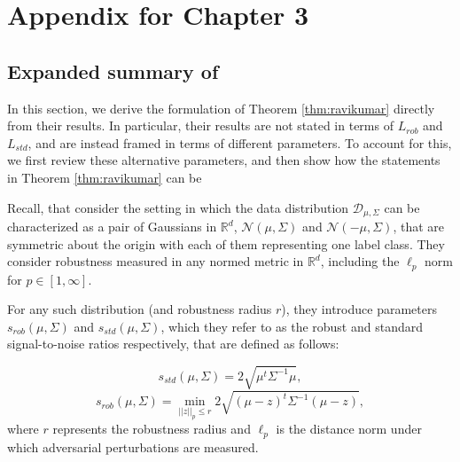 \graphicspath{{./chapters/chapter2/}}
\newcommand\numeq[1]%
  {\stackrel{\scriptscriptstyle(\mkern-1.5mu#1\mkern-1.5mu)}{=}}
 \newcommand\numgeq[1]%
  {\stackrel{\scriptscriptstyle(\mkern-1.5mu#1\mkern-1.5mu)}{\geq}}
  
\def\D{{\mathcal D}}
\def\Pphi{\overline{\Phi}}
\def\F{{\mathcal F}}
\def\N{{\mathcal N}}
\def\E{{\mathbb E}}
\def\A{\Pi}
\def\B{\Sigma}
\def\diam{\text{diam}}
\def\c{\mathcal L}
\def\l{\ell}
\def\seq{seq}
\def\R{\mathbb{R}}
\def\C{\mathcal C}
\def\p{p}
\def\s{size}
\def\L{\mathcal L}
\def\o{opt}
\def\H{\mathcal H}
\def\calH{\mathcal H}
\def\of{approxCluster}
\def\on{onlineCluster}
\def\R{\mathbb R}
\def\Y{\{\pm 1\}}
\def\U{\mathbb U}
\def\dd{\Delta}
\def\simp{{U\Delta}}
\def\g{g}
\def\rr{R}
\def\f{f}


\chapter{Appendix for Chapter 3}

\section{Expanded summary of \cite{ravikumar20}}\label{sec:appendix_comparison}

In this section, we derive the formulation of Theorem \ref{thm:ravikumar} directly from their results. In particular, their results are not stated in terms of $L_{rob}$ and $L_{std}$, and are instead framed in terms of different parameters. To account for this, we first review these alternative parameters, and then show how the statements in Theorem \ref{thm:ravikumar} can be 

Recall, that \cite{ravikumar20} consider the setting in which the data distribution $\D_{\mu, \Sigma}$ can be characterized as a pair of Gaussians in $\R^d$, $\N(\mu, \Sigma)$ and $\N(-\mu, \Sigma)$, that are symmetric about the origin with each of them representing one label class. They consider robustness measured in any normed metric in $\R^d$, including the $\ell_p$ norm for $p \in [1, \infty]$. 

For any such distribution (and robustness radius $r$), they introduce parameters $s_{rob}(\mu, \Sigma)$ and $s_{std}(\mu, \Sigma)$, which they refer to as the robust and standard signal-to-noise ratios respectively, that are defined as follows:

$$s_{std}(\mu, \Sigma) = 2\sqrt{\mu^t\Sigma^{-1}\mu},$$ $$s_{rob}(\mu, \Sigma) = \min_{||z||_p \leq r} 2\sqrt{(\mu - z)^t\Sigma^{-1}(\mu - z)},$$ where $r$ represents the robustness radius and $\ell_p$ is the distance norm under which adversarial perturbations are measured. 

